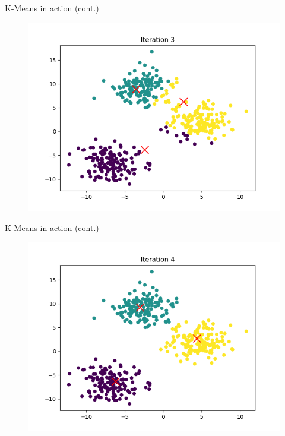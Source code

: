 \documentclass[serif, aspectratio=169]{beamer}
\begin{document}
\begin{frame}{K-Means in action (cont.)}
    \begin{figure}
        \centering
        \includegraphics[width=\textwidth]{kmeans_in_action_figures/kmeans_iter_3.png}
    \end{figure}
\end{frame}
\begin{frame}{K-Means in action (cont.)}
    \begin{figure}
        \centering
        \includegraphics[width=\textwidth]{kmeans_in_action_figures/kmeans_iter_4.png}
    \end{figure}
\end{frame}
\end{document}
